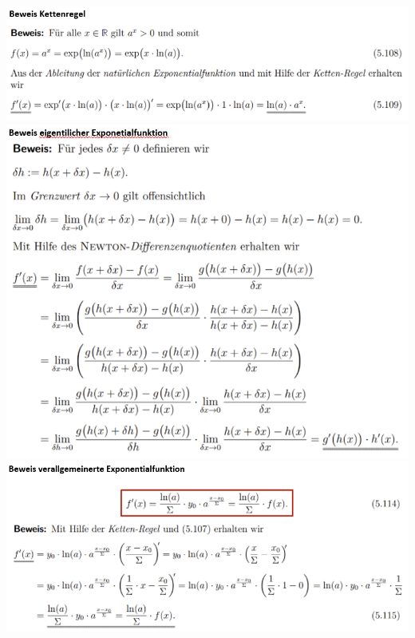 \includegraphics[width=\columnwidth]{./images/diff4.png}
\includegraphics[width=\columnwidth]{./images/diff5.png}
\includegraphics[width=\columnwidth]{./images/diff6.png}
